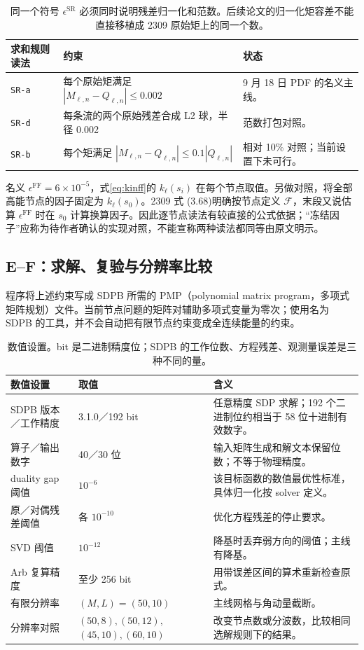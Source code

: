 \documentclass[UTF8,a4paper,11pt,fontset=fandol]{ctexart}
\numberwithin{equation}{section}
\newcommand{\eSR}{\epsilon^{\mathrm{SR}}}
\newcommand{\eFF}{\epsilon^{\mathrm{FF}}}
\newcommand{\Fcal}{\mathcal F}
\newcommand{\code}[1]{{\urlstyle{tt}\nolinkurl{#1}}}
\begin{document}
\begin{table}[H]\centering\small
\begin{tabularx}{\linewidth}{lYY}
\toprule
求和规则读法 & 约束 & 状态\\
\midrule
\code{SR-a} & 每个原始矩满足 \(|M_{\ell,n}-Q_{\ell,n}|\le0.002\) & 9 月 18 日 PDF 的名义主线。\\
\code{SR-d} & 每条流的两个原始残差合成 L2 球，半径 0.002 & 范数打包对照。\\
\code{SR-b} & 每个矩满足 \(|M_{\ell,n}-Q_{\ell,n}|\le0.1|Q_{\ell,n}|\) & 相对 10\% 对照；当前设置下未可行。\\
\bottomrule
\end{tabularx}
\caption{同一个符号 \(\eSR\) 必须同时说明残差归一化和范数。后续论文的归一化矩容差不能直接移植成 2309 原始矩上的同一个数。}
\end{table}

名义 \(\eFF=6\times10^{-5}\)，式\eqref{eq:kinff}的 \(k_\ell(s_i)\) 在每个节点取值。另做对照，将全部高能节点的因子固定为 \(k_\ell(s_0)\)。2309 式 (3.68)明确按节点定义 \(\Fcal\)，末段又说估算 \(\eFF\) 时在 \(s_0\) 计算换算因子。因此逐节点读法有较直接的公式依据；“冻结因子”应称为待作者确认的实现对照，不能宣称两种读法都同等由原文明示。

\subsection{E--F：求解、复验与分辨率比较}
程序将上述约束写成 SDPB 所需的 PMP（polynomial matrix program，多项式矩阵规划）文件。当前节点问题的矩阵对辅助多项式变量为零次；使用名为 SDPB 的工具，并不会自动把有限节点约束变成全连续能量的约束。

\begin{table}[H]\centering\small
\begin{tabularx}{\linewidth}{P{40mm}P{28mm}Y}
\toprule
数值设置 & 取值 & 含义\\
\midrule
SDPB 版本／工作精度 & 3.1.0／192 bit & 任意精度 SDP 求解；192 个二进制位约相当于 58 位十进制有效数字。\\
算子／输出数字 & 40／30 位 & 输入矩阵生成和解文本保留位数；不等于物理精度。\\
duality gap 阈值 & \(10^{-6}\) & 该目标函数的数值最优性标准，具体归一化按 solver 定义。\\
原／对偶残差阈值 & 各 \(10^{-10}\) & 优化方程残差的停止要求。\\
SVD 阈值 & \(10^{-12}\) & 降基时丢弃弱方向的阈值；主线有降基。\\
Arb 复算精度 & 至少 256 bit & 用带误差区间的算术重新检查原式。\\
有限分辨率 & \((M,L)=(50,10)\) & 主线网格与角动量截断。\\
分辨率对照 & \((50,8),(50,12),\)\newline\((45,10),(60,10)\) & 改变节点数或分波数，比较相同选解规则下的结果。\\
\bottomrule
\end{tabularx}
\caption{数值设置。bit 是二进制精度位；SDPB 的工作位数、方程残差、观测量误差是三种不同的量。}
\end{table}
\end{document}
